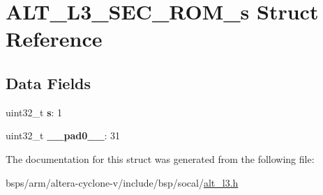 \hypertarget{structALT__L3__SEC__ROM__s}{}\section{A\+L\+T\+\_\+\+L3\+\_\+\+S\+E\+C\+\_\+\+R\+O\+M\+\_\+s Struct Reference}
\label{structALT__L3__SEC__ROM__s}
\subsection*{Data Fields}
\begin{DoxyCompactItemize}
\item 
\mbox{\label{structALT__L3__SEC__ROM__s_aff707cc7eb88acfa59c31fa143c109d9}} 
uint32\+\_\+t {\bfseries s}\+: 1
\item 
\mbox{\label{structALT__L3__SEC__ROM__s_aece61c6f9fd947fc4d29ccd9960681fa}} 
uint32\+\_\+t {\bfseries \+\_\+\+\_\+pad0\+\_\+\+\_\+}\+: 31
\end{DoxyCompactItemize}


The documentation for this struct was generated from the following file\+:\begin{DoxyCompactItemize}
\item 
bsps/arm/altera-\/cyclone-\/v/include/bsp/socal/\mbox{\hyperlink{alt__l3_8h}{alt\+\_\+l3.\+h}}\end{DoxyCompactItemize}
